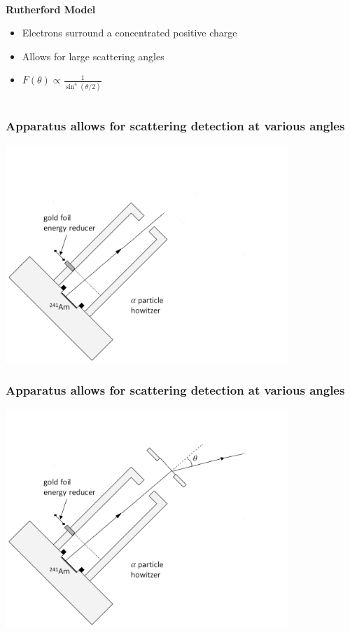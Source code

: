 \documentclass{beamer}
\begin{document}
\begin{frame}
\begin{columns}
\begin{column}{0.5\textwidth}
\begin{center}
      \\
      \textbf{Rutherford Model}
      \begin{itemize}
        \pause
      \item Electrons surround a concentrated positive charge
        \pause
      \item Allows for large scattering angles
        \pause
      \item $F(\theta) \propto \frac{1}{\sin^4(\theta/2)}$
    \end{itemize}
  \end{center}
  \end{column}
\end{columns}
\end{frame}

\begin{frame}
  \frametitle{Apparatus allows for scattering detection at various angles}
  \begin{center}
  \includegraphics[width=0.8\textwidth]{apparatus-phi-detect-gold}
\end{center}
\end{frame}

\begin{frame}
  \frametitle{Apparatus allows for scattering detection at various angles}
  \begin{center}
  \includegraphics[width=0.8\textwidth]{apparatus-phi-detect}
\end{center}
\end{frame}
\end{document}
